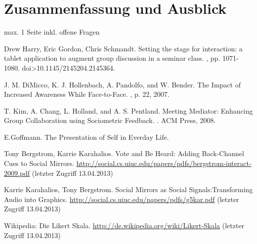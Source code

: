 \documentclass{seminarvorlage}
\begin{document}
\section{Zusammenfassung und Ausblick}
max. 1 Seite
inkl. offene Fragen
% 

\begin{thebibliography}{9}

Drew Harry, Eric Gordon, Chris Schmandt.
\newblock Setting the stage for interaction: a tablet application to augment group discussion in a seminar class. 
, pp. 1071-1080. doi>10.1145/2145204.2145364. 

J. M. DiMicco, K. J. Hollenbach, A. Pandolfo, and W. Bender.
\newblock The Impact of Increased Awareness While Face-to-Face.
, p. 22, 2007.

T. Kim, A. Chang, L. Holland, and A. S. Pentland.
\newblock Meeting Mediator: Enhancing Group Collaboration using Sociometric Feedback. 
. ACM Press, 2008.

E.Goffmann.
\newblock The Presentation of Self in Everday Life.

Tony Bergstrom, Karrie Karahalios. 
\newblock Vote and Be Heard: Adding Back-Channel Cues to Social Mirrors.
 \url {http://social.cs.uiuc.edu/papers/pdfs/bergstrom-interact-2009.pdf} (letzter Zugriff 13.04.2013)

Karrie Karahalios, Tony Bergstrom. 
\newblock Social Mirrors as Social Signals:Transforming Audio into Graphics.
 \url {http://social.cs.uiuc.edu/papers/pdfs/g5kar.pdf} (letzter Zugriff 13.04.2013)


Wikipedia: Die Likert Skala.
\newblock \url {http://de.wikipedia.org/wiki/Likert-Skala} (letzter Zugriff 13.04.2013)

\end{thebibliography}
\end{document}
